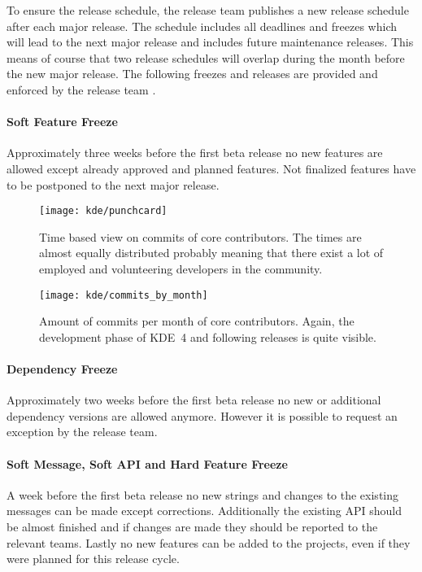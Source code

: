 To ensure the release schedule, the release team publishes a new release
schedule after each major release. The schedule includes all deadlines and
freezes which will lead to the next major release and includes future
maintenance releases. This means of course that two release schedules will
overlap during the month before the new major release. The following freezes
and releases are provided and enforced by the release team
\cite{KDEReleaseSchedule}.

\paragraph{Soft Feature Freeze}

Approximately three weeks before the first beta release no new features are
allowed except already approved and planned features. Not finalized features
have to be postponed to the next major release.

\begin{figure}[hbtp]
  \centering
  \texttt{[image: kde/punchcard]}
  \caption[Time Based View on Commits, KDE]
  {Time based view on commits of core contributors. The times are almost
    equally distributed probably meaning that there exist a lot of employed and
    volunteering developers in the community.}
  \label{fig:kde:p}
\end{figure}

\begin{figure}[htbp]
  \centering
  \texttt{[image: kde/commits\_by\_month]}
  \caption[Commits by Month, KDE]
  {Amount of commits per month of core contributors. Again, the development
    phase of KDE~4 and following releases is quite visible.}
  \label{fig:kde:cbm}
\end{figure}

\paragraph{Dependency Freeze}

Approximately two weeks before the first beta release no new or additional
dependency versions are allowed anymore. However it is possible to request an
exception by the release team.

\paragraph{Soft Message, Soft API and Hard Feature Freeze}

A week before the first beta release no new strings and changes to the
existing messages can be made except corrections. Additionally the existing
\ac{API} should be almost finished and if changes are made they should be
reported to the relevant teams. Lastly no new features can be added to the
projects, even if they were planned for this release cycle.

